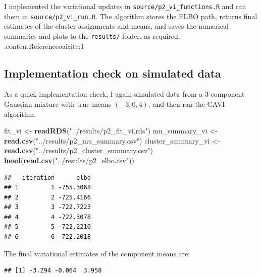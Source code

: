 \documentclass[
]{article}
\newenvironment{Shaded}{\begin{snugshade}}{\end{snugshade}}
\newcommand{\DecValTok}[1]{\textcolor[rgb]{0.00,0.00,0.81}{#1}}
\newcommand{\FunctionTok}[1]{\textcolor[rgb]{0.13,0.29,0.53}{\textbf{#1}}}
\newcommand{\NormalTok}[1]{#1}
\newcommand{\OtherTok}[1]{\textcolor[rgb]{0.56,0.35,0.01}{#1}}
\newcommand{\SpecialCharTok}[1]{\textcolor[rgb]{0.81,0.36,0.00}{\textbf{#1}}}
\newcommand{\StringTok}[1]{\textcolor[rgb]{0.31,0.60,0.02}{#1}}
\begin{document}
I implemented the variational updates in
\texttt{source/p2\_vi\_functions.R} and ran them in
\texttt{source/p2\_vi\_run.R}. The algorithm stores the ELBO path,
returns final estimates of the cluster assignments and means, and saves
the numerical summaries and plots to the \texttt{results/} folder, as
required. :contentReference{oaicite:1}

\subsection{Implementation check on simulated
data}\label{implementation-check-on-simulated-data-1}

As a quick implementation check, I again simulated data from a
3-component Gaussian mixture with true means \((-3, 0, 4)\), and then
ran the CAVI algorithm.

\begin{Shaded}
\begin{Highlighting}[]
\NormalTok{fit\_vi }\OtherTok{\textless{}{-}} \FunctionTok{readRDS}\NormalTok{(}\StringTok{"../results/p2\_fit\_vi.rds"}\NormalTok{)}
\NormalTok{mu\_summary\_vi }\OtherTok{\textless{}{-}} \FunctionTok{read.csv}\NormalTok{(}\StringTok{"../results/p2\_mu\_summary.csv"}\NormalTok{)}
\NormalTok{cluster\_summary\_vi }\OtherTok{\textless{}{-}} \FunctionTok{read.csv}\NormalTok{(}\StringTok{"../results/p2\_cluster\_summary.csv"}\NormalTok{)}
\FunctionTok{head}\NormalTok{(}\FunctionTok{read.csv}\NormalTok{(}\StringTok{"../results/p2\_elbo.csv"}\NormalTok{))}
\end{Highlighting}
\end{Shaded}

\begin{verbatim}
##   iteration      elbo
## 1         1 -755.3068
## 2         2 -725.4166
## 3         3 -722.7223
## 4         4 -722.3078
## 5         5 -722.2210
## 6         6 -722.2018
\end{verbatim}

The final variational estimates of the component means are:

\begin{Shaded}
\end{Shaded}

\begin{verbatim}
## [1] -3.294 -0.064  3.958
\end{verbatim}
\end{document}
